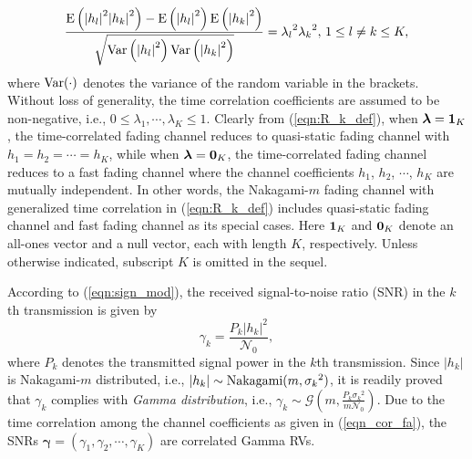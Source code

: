 \documentclass[12pt,onecolumn,draftcls]{IEEEtran}
\newcommand{\bs}{\boldsymbol}
\begin{document}
\begin{align}
\label{eqn_cor_fa}
 \frac{{{\rm{E}}\left( {{{\left| {{h_{l}}} \right|}^2}{{\left| {{h_{k}}} \right|}^2}} \right) - {\rm{E}}\left( {{{\left| {{h_{l}}} \right|}^2}} \right){\rm{E}}\left( {{{\left| {{h_{k}}} \right|}^2}} \right)}}{{\sqrt {{\rm{Var}}\left( {{{\left| {{h_{l}}} \right|}^2}} \right){\rm{Var}}\left( {{{\left| {{h_{k}}} \right|}^2}} \right)} }}
= {\lambda _{l}}^2{\lambda _{k}}^2,\, 1 \le l \ne k \le K,
\end{align}
where ${\rm Var}(\cdot)$ denotes the variance of the random variable in the brackets. Without loss of generality, the time correlation coefficients are assumed to be non-negative, i.e., $0 \le \lambda _1,\cdots,\lambda _K \le 1$. Clearly from (\ref{eqn:R_k_def}), when ${\boldsymbol{\lambda }} = {\bf 1}_K$, the time-correlated fading channel reduces to quasi-static fading channel with $h_1=h_2=\cdots=h_K$, while when ${\boldsymbol{\lambda }} = {\bf 0}_K$, the time-correlated fading channel reduces to a fast fading channel where the channel coefficients $h_1$, $h_2$, $\cdots$, $h_K$ are mutually independent. In other words, the Nakagami-$m$ fading channel with generalized time correlation in (\ref{eqn:R_k_def}) includes quasi-static fading channel and fast fading channel as its special cases. Here ${\bf 1}_K$ and ${\bf 0}_K$ denote an all-ones vector and a null vector, each with length $K$, respectively. Unless otherwise indicated, subscript $K$ is omitted in the sequel.


According to (\ref{eqn:sign_mod}), the received signal-to-noise ratio (SNR) in the $k$th transmission is given by
\begin{equation}\label{eqn:SNR}
{\gamma _k} = \frac{{P_k}{\left| {{h_k}} \right|^2}}{\mathcal N_0} ,
\end{equation}
where $P_k$ denotes the transmitted signal power in the $k$th transmission. Since $\left| {{h_k}} \right|$ is Nakagami-$m$ distributed, i.e., $\left| {{h_k}} \right| \sim {\rm Nakagami}(m,{\sigma_k}^2)$, it is readily proved that ${\gamma _k} $ complies with \emph{Gamma distribution}, i.e., ${\gamma _k} \sim \mathcal G\left( {m,\frac{{P_k}{\sigma _k}^2}{m\mathcal N_0}} \right)$. Due to the time correlation among the channel coefficients as given in (\ref{eqn_cor_fa}), the SNRs $\bs \gamma = (\gamma _1,\gamma _2,\cdots,\gamma _K)$ are correlated Gamma RVs.%


\end{document}
